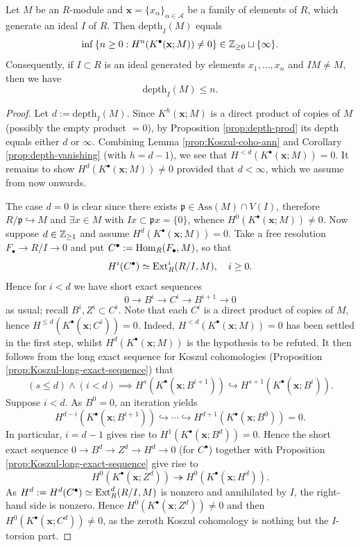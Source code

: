 \begin{theorem}\label{prop:Koszul-depth}
	Let $M$ be an $R$-module and $\mathbf{x} = \{x_\alpha \}_{\alpha \in \mathcal{A}}$ be a family of elements of $R$, which generate an ideal $I$ of $R$. Then $\mathrm{depth}_I(M)$ equals
	\[ \inf \left\{n \geq 0: H^n(K^\bullet(\mathbf{x}; M)) \neq 0 \right\} \in \mathbb{Z}_{\geq 0} \sqcup \{\infty \} . \]
	Consequently, if $I \subset R$ is an ideal generated by elements $x_1, \ldots, x_n$ and $IM \neq M$, then we have
	\[ \mathrm{depth}_I(M) \leq n. \]
\end{theorem}
\begin{proof}
	Let $d := \text{depth}_I(M)$. Since $K^h(\mathbf{x}; M)$ is a direct product of copies of $M$ (possibly the empty product $=0$), by Proposition \ref{prop:depth-prod} its depth equals either $d$ or $\infty$. Combining Lemma \ref{prop:Koszul-coho-ann} and Corollary \ref{prop:depth-vanishing} (with $h = d-1$), we see that $H^{< d}(K^\bullet(\mathbf{x}; M)) = 0$. It remains to show $H^d(K^\bullet(\mathbf{x}; M)) \neq 0$ provided that $d < \infty$, which we assume from now onwards.

	The case $d=0$ is clear since there exists $\mathfrak{p} \in \text{Ass}(M) \cap V(I)$, therefore $R/\mathfrak{p} \hookrightarrow M$ and $\exists x \in M$ with $Ix \subset \mathfrak{p}x = \{0\}$, whence $H^0(K^\bullet(\mathbf{x}; M)) \neq 0$. Now suppose $d \in \mathbb{Z}_{\geq 1}$ and assume $H^d(K^\bullet(\mathbf{x}; M)) = 0$. Take a free resolution $F_\bullet \to R/I \to 0$ and put $C^\bullet := \operatorname{Hom}_R(F_\bullet, M)$, so that
	\[ H^i(C^\bullet) \simeq \operatorname{Ext}^i_R(R/I, M), \quad i \geq 0. \]
	Hence for $i < d$ we have short exact sequences
	\[ 0 \to B^i \to C^i \to B^{i+1} \to 0 \]
	as usual; recall $B^i, Z^i \subset C^i$. Note that each $C^i$ is a direct product of copies of $M$, hence $H^{\leq d}(K^\bullet(\mathbf{x}; C^i)) = 0$. Indeed, $H^{< d}(K^\bullet(\mathbf{x}; M))=0$ has been settled in the first step, whilst $H^d(K^\bullet(\mathbf{x}; M))$ is the hypothesis to be refuted. It then follows from the long exact sequence for Koszul cohomologies (Proposition \ref{prop:Koszul-long-exact-sequence}) that
	\[ (s \leq d) \wedge (i < d) \implies H^s(K^\bullet(\mathbf{x}; B^{i+1})) \hookrightarrow H^{s+1}(K^\bullet(\mathbf{x}; B^i)). \]
	Suppose $i < d$. As $B^0 = 0$, an iteration yields
	\[ H^{d-i}(K^\bullet(\mathbf{x}; B^{i+1})) \hookrightarrow \cdots \hookrightarrow H^{d+1}(K^\bullet(\mathbf{x}; B^0)) = 0. \]
	In particular, $i=d-1$ gives rise to $H^1(K^\bullet(\mathbf{x}; B^d)) = 0$. Hence the short exact sequence $0 \to B^d \to Z^d \to H^d \to 0$ (for $C^\bullet$) together with Proposition \ref{prop:Koszul-long-exact-sequence} give rise to
	\[ H^0(K^\bullet(\mathbf{x}; Z^d)) \twoheadrightarrow H^0(K^\bullet(\mathbf{x}; H^d)). \]
	As $H^d := H^d(C^\bullet) \simeq \operatorname{Ext}^d_R(R/I, M)$ is nonzero and annihilated by $I$, the right-hand side is nonzero. Hence $H^0(K^\bullet(\mathbf{x}; Z^d)) \neq 0$ and then $H^0(K^\bullet(\mathbf{x}; C^d)) \neq 0$, as the zeroth Koszul cohomology is nothing but the $I$-torsion part.
	

\end{proof}
